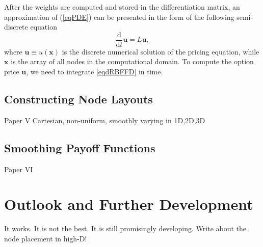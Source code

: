 \documentclass{UUThesisTemplate}
\begin{document}
\par
After the weights are computed and stored in the differentiation matrix, an approximation of (\ref{eqPDE}) can be presented in the form of the following semi-discrete equation
\begin{equation}
\label{eqdRBFFD}
\frac{\mathrm{d}}{\mathrm{d} t}\mathbf{u}=L\mathbf{u},
\end{equation}
where $\mathbf{u}\equiv u(\mathbf{x})$ is the discrete numerical solution of the pricing equation, while $\mathbf{x}$ is the array of all nodes in the computational domain. To compute the option price $\mathbf{u}$, we need to integrate \eqref{eqdRBFFD} in time.
%
\section{Constructing Node Layouts}
Paper V
Cartesian, non-uniform, smoothly varying in 1D,2D,3D
%
\section{Smoothing Payoff Functions}
Paper VI
%
%
\chapter{Outlook and Further Development}
\label{ch:outlook}
It works. It is not the best. It is still promisingly developing.
Write about the node placement in high-D!
\backmatter
    
    
\end{document}
